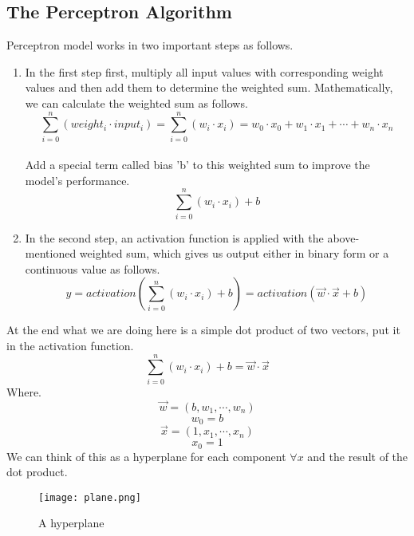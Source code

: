 \subsection{The Perceptron Algorithm}
Perceptron model works in two important steps as follows.
\begin{enumerate}
\item In the first step first, multiply all input values with corresponding weight values and then add
  them to determine the weighted sum. Mathematically, we can calculate the weighted sum as follows.\\
  \[
    \sum_{i = 0}^{n}(weight_i \cdot input_i) = \sum_{i = 0}^{n}(w_i \cdot x_i) = w_0 \cdot x_0 + w_1 \cdot x_1
    + \cdots + w_n \cdot x_n
  \]\\
  Add a special term called bias 'b' to this weighted sum to improve the model's performance.\\
  \[
    \sum_{i = 0}^{n}(w_i \cdot x_i) + b
  \]
\item In the second step, an activation function is applied with the above-mentioned weighted sum,
  which gives us output either in binary form or a continuous value as follows.\\
  \[
    y = activation(\sum_{i = 0}^{n}(w_i \cdot x_i) + b) = activation(\vec{w} \cdot \vec{x} + b)
  \]
\end{enumerate}
At the end what we are doing here is a simple dot product of two vectors, put it in the activation
function.
\[
  \sum_{i = 0}^{n}(w_i \cdot x_i) + b = \vec{w} \cdot \vec{x} 
\]
Where.
\[
  \vec{w} = (b, w_1, \cdots, w_n)
\]
\[
  w_0 = b
\]
\[
  \vec{x} = (1, x_1, \cdots, x_n)
\]
\[
  x_0 = 1
\]
We can think of this as a hyperplane for each component $\forall x$ and the result of the dot product.

\begin{figure}[!hb]
  \centering
  \texttt{[image: plane.png]}
  \caption{A hyperplane}
\end{figure}

